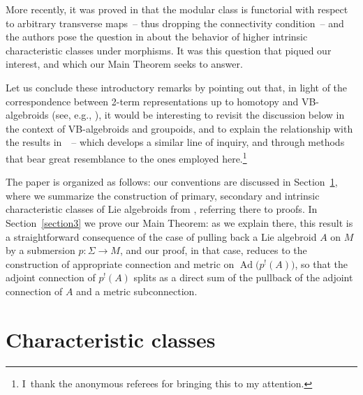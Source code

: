 \documentclass[pdftex]{sigma}
\numberwithin{equation}{section}
\newcommand{\8}{\infty}
\begin{document}
More recently, it was proved in \cite[Theorem~3.10]{YvetteLaurentAlan} that the modular class is functorial with respect to arbitrary transverse maps~-- thus dropping the connectivity condition~-- and the authors pose the question in \cite[(iii), p.~729]{YvetteLaurentAlan} about the behavior of higher intrinsic characteristic classes under morphisms. It was this question that piqued our interest, and which our Main Theorem seeks to answer.

Let us conclude these introductory remarks by pointing out that, in light of the correspondence between 2-term representations up to homotopy and VB-algebroids (see, e.g., \cite{GraciaMehta}), it would be interesting to revisit the discussion below in the context of VB-algebroids and groupoids, and to explain the relationship with the results in~\cite{HoyoOrtiz}~-- which develops a similar line of inquiry, and through methods that bear great resemblance to the ones employed here.\footnote{I~thank the anonymous referees for bringing this to my attention.}

The paper is organized as follows: our conventions are discussed in Section~\ref{sec : Characteristic classes}, where we summarize the construction of primary, secondary and intrinsic characteristic classes of Lie algebroids from \cite{CrainicNL,CrFer_Char}, referring there to proofs. In Section~\ref{section3} we prove our Main Theorem: as we explain there, this result is a straightforward consequence of the case of pulling back a Lie algebroid $A$ on $M$ by a submersion $p\colon \Sigma\to M$, and our proof, in that case, reduces to the construction of appropriate connection and metric on $\operatorname{Ad}\big(p^!(A)\big)$, so that the adjoint connection of $p^!(A)$ splits as a direct sum of the pullback of the adjoint connection of $A$ and a metric subconnection.

\section{Characteristic classes}\label{sec : Characteristic classes}
\end{document}
